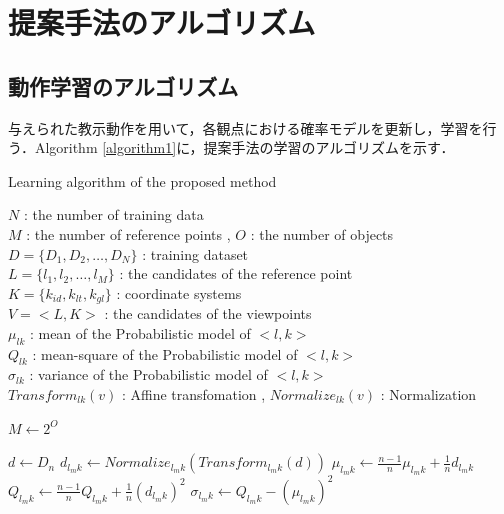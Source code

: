 ﻿\appendix
\chapter{提案手法のアルゴリズム}\label{appendix3}

\section{動作学習のアルゴリズム}

与えられた教示動作を用いて，各観点における確率モデルを更新し，学習を行う．Algorithm \ref{algorithm1}に，提案手法の学習のアルゴリズムを示す．
	\begin{algorithm}[b]
		\caption{ Learning algorithm of the proposed method}
		\label{algorithm1}
		\begin{algorithmic}
			\REQUIRE
				$N$ : the number of training data \\
				$M$ : the number of reference points , 
				$O$ : the number of objects \\
				$D = \{D_{1} , D_{2} , \ldots , D_{N}\}$ : training dataset \\
				$L = \{l_{1} , l_{2} , \ldots , l_{M}\}$ : the candidates of the reference point \\
				$K = \{k_{id} , k_{lt} , k_{gl}\}$ : coordinate systems \\
				$V = <L , K>$ : the candidates of the viewpoints \\
				$μ_{lk}$ : mean of the Probabilistic model of $<l , k>$ \\
				$Q_{lk}$ : mean-square of the Probabilistic model of $<l , k>$ \\
				$σ_{lk}$ : variance of the Probabilistic model of $<l , k>$ \\
				$Transform_{lk}(v)$ : Affine transfomation , 
				$Normalize_{lk}(v)$ : Normalization
		\end{algorithmic}
		\begin{algorithmic}[1]
			\STATE $M \leftarrow 2^{O}$
			
			\FOR{$n=1$ to $N$}
				\STATE $d \leftarrow D_{n}$
				\FOR{$m=1$ to $M$}
					\FOR{all $k ∈K$}
						\STATE $d_{l_{m}k} \leftarrow Normalize_{l_{m}k}(Transform_{l_{m}k}(d))$
						\STATE $μ_{l_{m}k} \leftarrow \frac{n-1}{n}μ_{l_{m}k} + \frac{1}{n}d_{l_{m}k}$
						\STATE $Q_{l_{m}k} \leftarrow \frac{n-1}{n}Q_{l_{m}k} + \frac{1}{n}(d_{l_{m}k})^2$
						\STATE $σ_{l_{m}k} \leftarrow Q_{l_{m}k} - (μ_{l_{m}k})^2$
					\ENDFOR
				\ENDFOR
			\ENDFOR
		\end{algorithmic}
	\end{algorithm}
